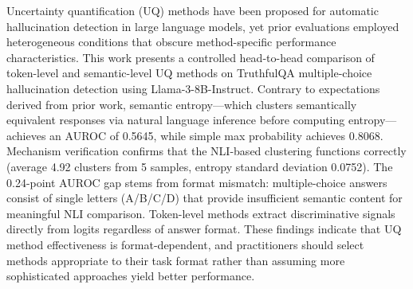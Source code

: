 
Uncertainty quantification (UQ) methods have been proposed for automatic hallucination detection in large language models, yet prior evaluations employed heterogeneous conditions that obscure method-specific performance characteristics. This work presents a controlled head-to-head comparison of token-level and semantic-level UQ methods on TruthfulQA multiple-choice hallucination detection using Llama-3-8B-Instruct. Contrary to expectations derived from prior work, semantic entropy---which clusters semantically equivalent responses via natural language inference before computing entropy---achieves an AUROC of 0.5645, while simple max probability achieves 0.8068. Mechanism verification confirms that the NLI-based clustering functions correctly (average 4.92 clusters from 5 samples, entropy standard deviation 0.0752). The 0.24-point AUROC gap stems from format mismatch: multiple-choice answers consist of single letters (A/B/C/D) that provide insufficient semantic content for meaningful NLI comparison. Token-level methods extract discriminative signals directly from logits regardless of answer format. These findings indicate that UQ method effectiveness is format-dependent, and practitioners should select methods appropriate to their task format rather than assuming more sophisticated approaches yield better performance.

